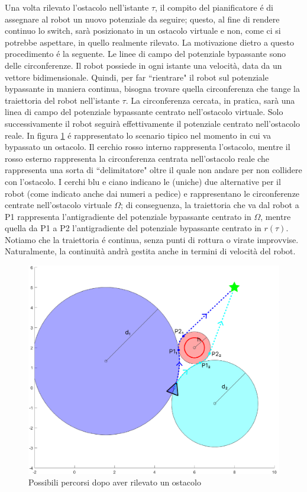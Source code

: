 \documentclass[14pt,a4paper]{extarticle}
\begin{document}
Una volta rilevato l'ostacolo nell'istante \(\tau\), il compito del pianificatore é di assegnare al robot un nuovo potenziale da seguire; questo, al fine di rendere continuo lo switch, sarà posizionato in un ostacolo virtuale e non, come ci si potrebbe aspettare, in quello realmente rilevato. La motivazione dietro a questo procedimento é la seguente. Le linee di campo del potenziale bypassante sono delle circonferenze. Il robot possiede in ogni istante una velocità, data da un vettore bidimensionale. Quindi, per far ``rientrare" il robot sul potenziale bypassante in maniera continua, bisogna trovare quella circonferenza che tange la traiettoria del robot nell'istante \(\tau\). La circonferenza cercata, in pratica, sarà una linea di campo del potenziale bypassante centrato nell'ostacolo virtuale. Solo successivamente il robot seguirà effettivamente il potenziale centrato nell'ostacolo reale. In figura \ref{circonferenze} é rappresentato lo scenario tipico nel momento in cui va bypassato un ostacolo. Il cerchio rosso interno rappresenta l'ostacolo, mentre il rosso esterno rappresenta la circonferenza centrata nell'ostacolo reale che rappresenta una sorta di ``delimitatore" oltre il quale non andare per non collidere con l'ostacolo. I cerchi blu e ciano indicano le (uniche) due alternative per il robot (come indicato anche dai numeri a pedice) e rappresentano le circonferenze centrate nell'ostacolo virtuale \(\Omega\); di conseguenza, la traiettoria che va dal robot a P1 rappresenta l'antigradiente del potenziale bypassante centrato in \(\Omega\), mentre quella da P1 a P2 l'antigradiente del potenziale bypassante centrato in \(r(\tau)\). Notiamo che la traiettoria é continua, senza punti di rottura o virate improvvise. Naturalmente, la continuità andrà gestita anche in termini di velocità del robot.

\begin{figure}[H]
\caption{Possibili percorsi dopo aver rilevato un ostacolo}
\label{circonferenze}
\centering
\includegraphics[width=\textwidth]{circonferenze.png}
\end{figure}
\end{document}
